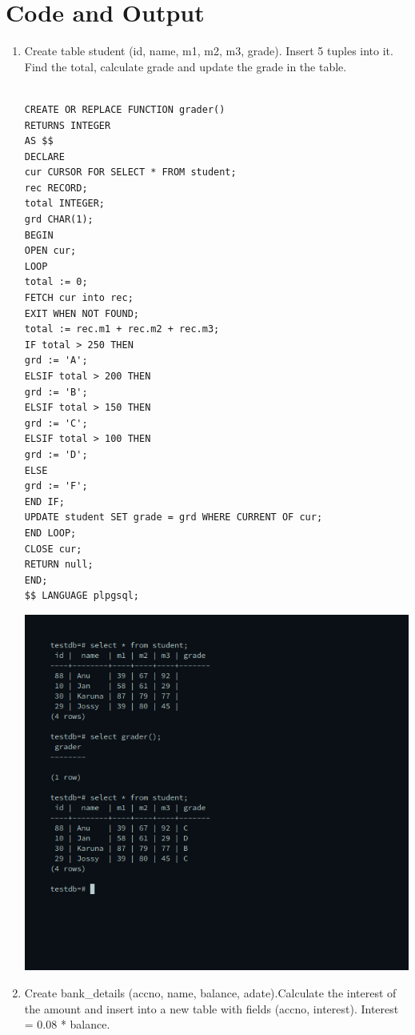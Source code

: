 \section{{Code and Output}}

\begin{enumerate}
\item Create table student (id, name, m1, m2, m3, grade). Insert 5 tuples into it. Find the total, calculate grade and update the grade in the table.
\begin{verbatim}

CREATE OR REPLACE FUNCTION grader()
RETURNS INTEGER
AS $$
DECLARE
cur CURSOR FOR SELECT * FROM student;
rec RECORD;
total INTEGER;
grd CHAR(1);
BEGIN
OPEN cur;
LOOP
total := 0;
FETCH cur into rec;
EXIT WHEN NOT FOUND;
total := rec.m1 + rec.m2 + rec.m3;
IF total > 250 THEN
grd := 'A';
ELSIF total > 200 THEN
grd := 'B';
ELSIF total > 150 THEN
grd := 'C';
ELSIF total > 100 THEN
grd := 'D';
ELSE
grd := 'F';
END IF;
UPDATE student SET grade = grd WHERE CURRENT OF cur;
END LOOP;
CLOSE cur;
RETURN null;
END;
$$ LANGUAGE plpgsql;
\end{verbatim}

\newline
\includegraphics[width=\linewidth]{../Images/Cursors/1.png}

\item Create bank\_details (accno, name, balance, adate).Calculate the interest of the amount and insert into a new table with fields (accno, interest). Interest = 0.08 * balance.\newline


\end{enumerate}

